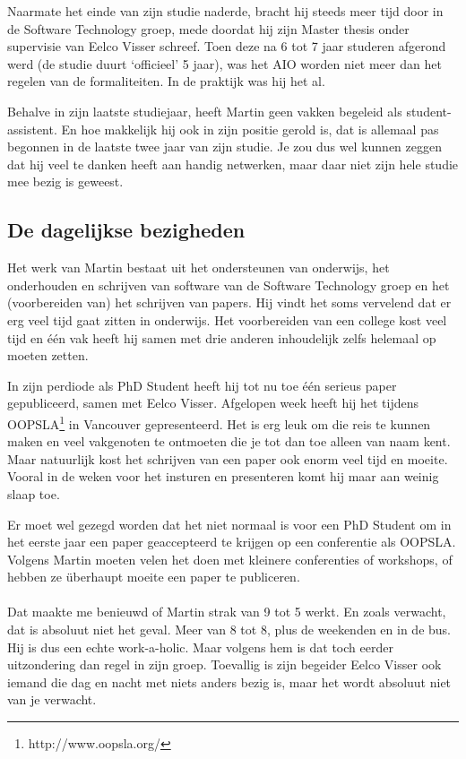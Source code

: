 \documentclass[a4paper,11pt]{article} %
\begin{document}
Naarmate het einde van zijn studie naderde, bracht hij steeds meer tijd door
in de Software Technology groep, mede doordat hij zijn Master thesis onder
supervisie van Eelco Visser schreef. Toen deze na 6 tot 7 jaar studeren
afgerond werd (de studie duurt `officieel' 5 jaar), was het AIO worden niet
meer dan het regelen van de formaliteiten. In de praktijk was hij het al.

Behalve in zijn laatste studiejaar, heeft Martin geen vakken begeleid als
student-assistent. En hoe makkelijk hij ook in zijn positie gerold is, dat is
allemaal pas begonnen in de laatste twee jaar van zijn studie. Je zou dus wel
kunnen zeggen dat hij veel te danken heeft aan handig netwerken, maar daar
niet zijn hele studie mee bezig is geweest.


\subsection*{De dagelijkse bezigheden}

Het werk van Martin bestaat uit het ondersteunen van onderwijs, het
onderhouden en schrijven van software van de Software Technology groep en het
(voorbereiden van) het schrijven van papers. Hij vindt het soms vervelend dat
er erg veel tijd gaat zitten in onderwijs. Het voorbereiden van een college
kost veel tijd en \'e\'en vak heeft hij samen met drie anderen inhoudelijk
zelfs helemaal op moeten zetten.

In zijn perdiode als PhD Student heeft hij tot nu toe \'e\'en serieus paper
gepubliceerd, samen met Eelco Visser. Afgelopen week heeft hij het tijdens
OOPSLA\footnote{http://www.oopsla.org/} in Vancouver gepresenteerd. Het is erg
leuk om die reis te kunnen maken en veel vakgenoten te ontmoeten die je tot
dan toe alleen van naam kent. Maar natuurlijk kost het schrijven van een paper
ook enorm veel tijd en moeite. Vooral in de weken voor het insturen en
presenteren komt hij maar aan weinig slaap toe.

Er moet wel gezegd worden dat het niet normaal is voor een PhD Student om in
het eerste jaar een paper geaccepteerd te krijgen op een conferentie als
OOPSLA. Volgens Martin moeten velen het doen met kleinere conferenties of
workshops, of hebben ze \"uberhaupt moeite een paper te publiceren.

\paragraph{}

Dat maakte me benieuwd of Martin strak van 9 tot 5 werkt. En zoals verwacht,
dat is absoluut niet het geval. Meer van 8 tot 8, plus de weekenden en in de
bus. Hij is dus een echte work-a-holic. Maar volgens hem is dat toch eerder
uitzondering dan regel in zijn groep. Toevallig is zijn begeider Eelco Visser
ook iemand die dag en nacht met niets anders bezig is, maar het wordt absoluut
niet van je verwacht.
\end{document}
